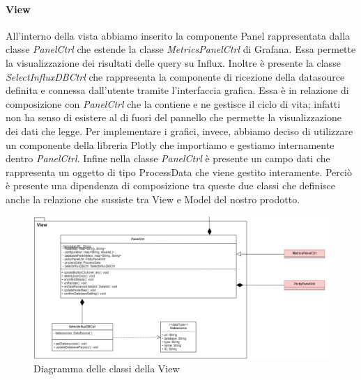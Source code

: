 			\paragraph{View}
			All'interno della vista abbiamo inserito la componente Panel rappresentata dalla classe \textit{PanelCtrl} che estende la classe \textit{MetricsPanelCtrl} di Grafana. Essa permette la visualizzazione dei risultati delle query su Influx.
			Inoltre è presente la classe \textit{SelectInfluxDBCtrl} che rappresenta la componente di ricezione della datasource definita e connessa dall'utente tramite l'interfaccia grafica. Essa è in relazione di composizione con \textit{PanelCtrl} che la contiene e ne gestisce il ciclo di vita; infatti non ha senso di esistere al di fuori del pannello che permette la visualizzazione dei dati che legge.
			Per implementare i grafici, invece, abbiamo deciso di utilizzare un componente della libreria Plotly che importiamo e gestiamo internamente dentro \textit{PanelCtrl}.
			Infine nella classe \textit{PanelCtrl} è presente un campo dati che rappresenta un oggetto di tipo ProcessData che viene gestito interamente. Perciò è presente una dipendenza di composizione tra queste due classi che definisce anche la relazione che sussiste tra View e Model del nostro prodotto. 
			\mbox{}
			\begin{landscape}
			\begin{figure} [H]
				\includegraphics[width=\linewidth]{./img/Diagrammi/d2.png}
				\caption{Diagramma delle classi della View}
			\end{figure}
		\end{landscape}
